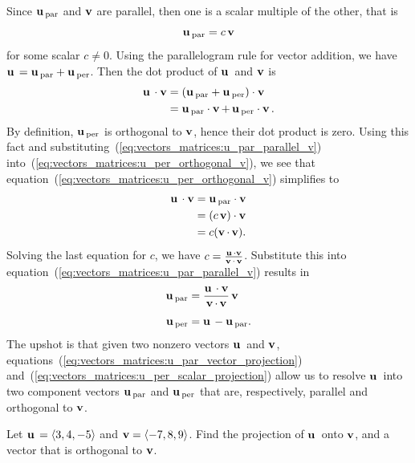 Since $\operatorname*{\mathbf{u}}{}_{\text{par}}$ and $\operatorname*{\mathbf{v}}$ are parallel, then one
is a scalar multiple of the other, that is
%
\begin{equation}
\label{eq:vectors_matrices:u_par_parallel_v}
\operatorname*{\mathbf{u}}{}_{\text{par}}
=
c\operatorname*{\mathbf{v}}
\end{equation}
%
for some scalar $c \neq 0$. Using the parallelogram
rule for vector addition, we have
$\operatorname*{\mathbf{u}}{} = \operatorname*{\mathbf{u}}{}_{\text{par}} + \operatorname*{\mathbf{u}}{}_{\text{per}}$. Then the dot product of
$\operatorname*{\mathbf{u}}{}$ and $\operatorname*{\mathbf{v}}$ is
%
\begin{equation}
\label{eq:vectors_matrices:u_per_orthogonal_v}
\begin{aligned}
\operatorname*{\mathbf{u}}{} \cdot \operatorname*{\mathbf{v}}
&=
(\operatorname*{\mathbf{u}}{}_{\text{par}} + \operatorname*{\mathbf{u}}{}_{\text{per}}) \cdot \operatorname*{\mathbf{v}} \\
&=
\operatorname*{\mathbf{u}}{}_{\text{par}} \cdot \operatorname*{\mathbf{v}} +
\operatorname*{\mathbf{u}}{}_{\text{per}} \cdot \operatorname*{\mathbf{v}}.
\end{aligned}
\end{equation}
%
By definition, $\operatorname*{\mathbf{u}}{}_{\text{per}}$ is orthogonal to $\operatorname*{\mathbf{v}}$,
hence their dot product is zero. Using this fact and
substituting~(\ref{eq:vectors_matrices:u_par_parallel_v})
into~(\ref{eq:vectors_matrices:u_per_orthogonal_v}), we see that
equation~(\ref{eq:vectors_matrices:u_per_orthogonal_v}) simplifies to
%
\begin{align*}
\operatorname*{\mathbf{u}}{} \cdot \operatorname*{\mathbf{v}}
&=
\operatorname*{\mathbf{u}}{}_{\text{par}} \cdot \operatorname*{\mathbf{v}} \\
&=
(c \operatorname*{\mathbf{v}}) \cdot \operatorname*{\mathbf{v}} \\
&=
c (\operatorname*{\mathbf{v}} \cdot \operatorname*{\mathbf{v}}).
\end{align*}
%
Solving the last equation for $c$, we have $c = \frac {\operatorname*{\mathbf{u}}{} \cdot
\operatorname*{\mathbf{v}}} {\operatorname*{\mathbf{v}} \cdot \operatorname*{\mathbf{v}}}$. Substitute this into
equation~(\ref{eq:vectors_matrices:u_par_parallel_v}) results in
%
\begin{align}
\vecu_{\vecpar}
&=
\frac {\vecu \cdot \vecv} {\vecv \cdot \vecv}
\vecv %
\label{eq:vectors_matrices:u_par_vector_projection} \\[4pt]
\vecu_{\vecper}
&=
\vecu - \vecu_{\vecpar}. %
\label{eq:vectors_matrices:u_per_scalar_projection}
\end{align}
%
The upshot is that given two nonzero vectors $\operatorname*{\mathbf{u}}{}$ and
$\operatorname*{\mathbf{v}}$, equations~(\ref{eq:vectors_matrices:u_par_vector_projection})
and~(\ref{eq:vectors_matrices:u_per_scalar_projection}) allow us to
resolve $\operatorname*{\mathbf{u}}{}$ into two component vectors $\operatorname*{\mathbf{u}}{}_{\text{par}}$ and
$\operatorname*{\mathbf{u}}{}_{\text{per}}$ that are, respectively,
parallel and
orthogonal to $\operatorname*{\mathbf{v}}$.

\begin{example}
Let $\operatorname*{\mathbf{u}}{} = \langle 3, 4, -5 \rangle$ and
$\operatorname*{\mathbf{v}} = \langle -7, 8, 9 \rangle$. Find the projection of $\operatorname*{\mathbf{u}}{}$
onto $\operatorname*{\mathbf{v}}$, and a vector that is orthogonal to $\operatorname*{\mathbf{v}}$.
\end{example}

